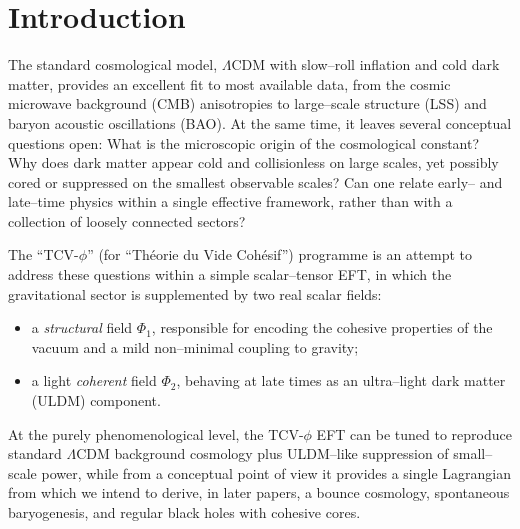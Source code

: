 \documentclass[aps,prd,onecolumn,nofootinbib,superscriptaddress]{revtex4-2}
\begin{document}
\section{Introduction}

The standard cosmological model, $\Lambda$CDM with slow--roll inflation and cold dark matter, provides an excellent fit to most available data, from the cosmic microwave background (CMB) anisotropies to large--scale structure (LSS) and baryon acoustic oscillations (BAO).
At the same time, it leaves several conceptual questions open:
What is the microscopic origin of the cosmological constant?
Why does dark matter appear cold and collisionless on large scales, yet possibly cored or suppressed on the smallest observable scales?
Can one relate early-- and late--time physics within a single effective framework, rather than with a collection of loosely connected sectors?

The ``TCV-$\phi$'' (for ``Théorie du Vide Cohésif'') programme is an attempt to address these questions within a simple scalar--tensor EFT, in which the gravitational sector is supplemented by two real scalar fields:
\begin{itemize}[leftmargin=1.5em]
  \item a \emph{structural} field $\Phi_1$, responsible for encoding the cohesive properties of the vacuum and a mild non--minimal coupling to gravity;
  \item a light \emph{coherent} field $\Phi_2$, behaving at late times as an ultra--light dark matter (ULDM) component.
\end{itemize}
At the purely phenomenological level, the TCV-$\phi$ EFT can be tuned to reproduce standard $\Lambda$CDM background cosmology plus ULDM--like suppression of small--scale power, while from a conceptual point of view it provides a single Lagrangian from which we intend to derive, in later papers, a bounce cosmology, spontaneous baryogenesis, and regular black holes with cohesive cores.
\end{document}
